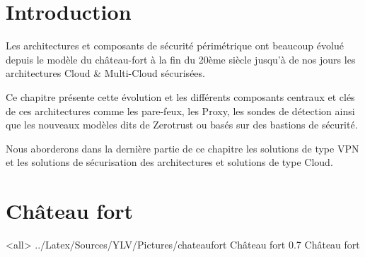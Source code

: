 
\section{Introduction}

Les architectures et composants de sécurité périmétrique ont beaucoup évolué depuis le modèle du château-fort à la fin du 20ème siècle jusqu'à de nos jours les architectures Cloud \& Multi-Cloud sécurisées.

Ce chapitre présente cette évolution et les différents composants centraux et clés de ces architectures comme les pare-feux, les Proxy, les sondes de détection ainsi que les nouveaux modèles dits de Zerotrust ou basés sur des bastions de sécurité.

Nous aborderons dans la dernière partie de ce chapitre les solutions de type VPN et les solutions de sécurisation des architectures et solutions de type Cloud.

\section{Château fort}



\mode<all>{\picframe
{../Latex/Sources/YLV/Pictures/chateaufort}%
{Château fort} %
{0.7} %
{Château fort} %
}

